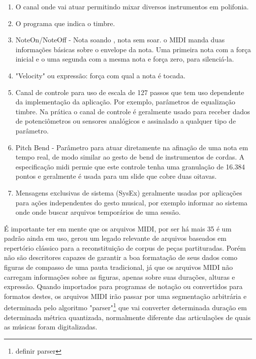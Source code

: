 \documentclass[
	12pt,				%
	openright,			%
	twoside,			%
	a4paper,			%
	english,			%
	french,				%
	spanish,			%
	brazil				%
	]{abntex2}
\begin{document}
\begin{enumerate}

\item O canal onde vai atuar permitindo mixar diversos instrumentos em polifonia.

\item O programa que indica o timbre.

\item NoteOn/NoteOff - Nota soando , nota sem soar. o MIDI manda duas informações básicas sobre o envelope da nota. Uma primeira nota com a força inicial e o uma segunda com a mesma nota e força zero, para silenciá-la.

\item "Velocity" ou expressão: força com qual a nota é tocada.

\item Canal de controle para uso de escala de 127 passos que tem uso dependente da implementação da aplicação. Por exemplo, parâmetros de equalização timbre. Na prática o canal de controle é geralmente usado para receber dados de potenciômetros ou sensores analógicos e assinalado a qualquer tipo de parâmetro.

\item Pitch Bend - Parâmetro para atuar diretamente na afinação de uma nota em tempo real, de modo similar ao gesto de bend de instrumentos de cordas. A especificação midi permie que este controle tenha uma granulação de 16.384 pontos e geralmente é usada para um slide que cobre duas oitavas.

\item Mensagens exclusivas de sistema (SysEx) geralmente usadas por aplicações para ações independentes do gesto musical, por exemplo informar ao sistema onde onde buscar arquivos temporários de uma sessão.
\end{enumerate}

É importante ter em mente que os arquivos MIDI, por ser há mais 35 é um padrão ainda em uso, gerou um legado relevante de arquivos baseados em repertório clássico para a reconstituição de corpus de peças partituradas. Porém não são descritores capazes de garantir a boa formatação de seus dados como figuras de compasso de uma pauta tradicional, já que os arquivos MIDI não carregam informações sobre as figuras, apenas sobre suas durações, alturas e expressão. Quando importados para programas de notação ou convertidos para formatos destes, os arquivos MIDI irão passar por uma segmentação arbitrária e determinada pelo algoritmo "parser"\footnote{definir parser} que vai converter determinada duração em determinada métrica quantizada, normalmente diferente das articulações de quais as músicas foram digitalizadas.
\end{document}
